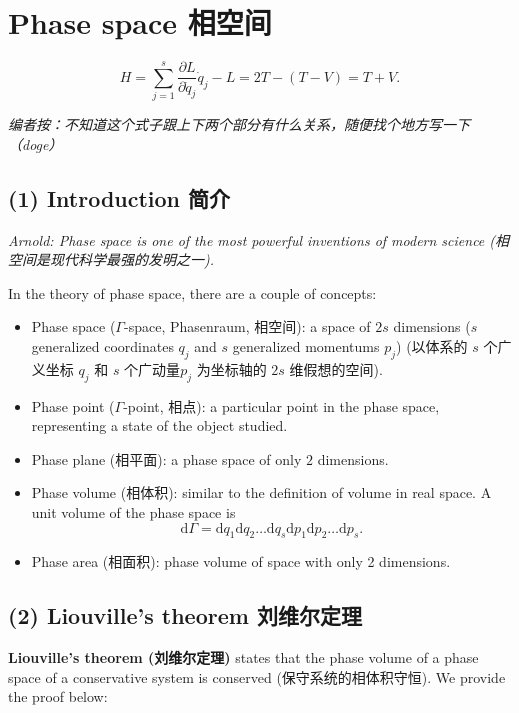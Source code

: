 \section{Phase space 相空间}\label{phase-space-ux76f8ux7a7aux95f4}

\[H = \sum_{j = 1}^{s} \frac{\partial L}{\partial \dot{q}_j} \dot{q}_j - L = 2T - (T - V) = T + V.\]

\emph{编者按：不知道这个式子跟上下两个部分有什么关系，随便找个地方写一下（doge）}

\subsection*{(1) Introduction 简介}\label{introduction-ux7b80ux4ecb}

\emph{Arnold: Phase space is one of the most powerful
inventions of modern science (相空间是现代科学最强的发明之一).}

In the theory of phase space, there are a couple of concepts:

\begin{itemize}
\tightlist{}
\item
  Phase space (\(\Gamma\)-space, Phasenraum, 相空间): a space of \(2s\) dimensions (\(s\) generalized coordinates \(q_j\) and \(s\) generalized momentums \(p_j\)) (以体系的 \(s\) 个广义坐标 \(q_j\) 和 \(s\) 个广动量\(p_j\) 为坐标轴的 \(2s\) 维假想的空间).
\item
  Phase point (\(\Gamma\)-point, 相点): a particular point in the phase
  space, representing a state of the object studied.
\item
  Phase plane (相平面): a phase space of only \(2\) dimensions.
\item
  Phase volume (相体积): similar to the definition of volume in real
  space. A unit volume of the phase space is
  \[\mathrm{d}\varGamma = \mathrm{d}q_1 \mathrm{d}q_2 \dots \mathrm{d}q_s \mathrm{d}p_1 \mathrm{d}p_2 \dots \mathrm{d}p_s.\]
\item
  Phase area (相面积): phase volume of space with only 2 dimensions.
\end{itemize}

\subsection*{(2) Liouville's theorem
刘维尔定理}\label{liouvilles-theorem-ux5218ux7ef4ux5c14ux5b9aux7406}

\textbf{Liouville's theorem (刘维尔定理)} states that the phase volume
of a phase space of a conservative system is conserved
(保守系统的相体积守恒). We provide the proof below:

